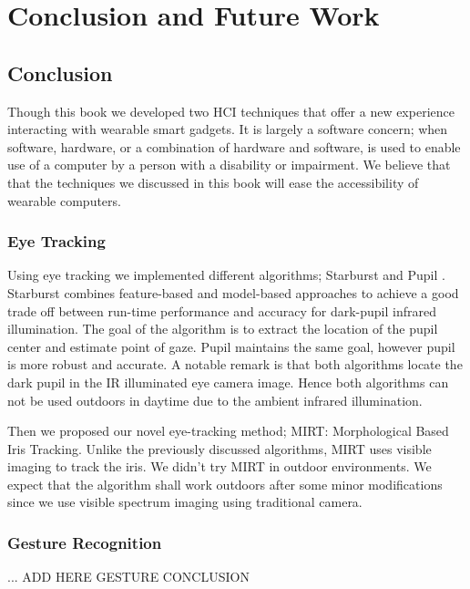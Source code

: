 \chapter{Conclusion and Future Work} 

\section{Conclusion} 
Though this book we developed two HCI techniques that offer a new experience interacting with wearable smart gadgets.  It is largely a software concern; when software, hardware, or a combination of hardware and software, is used to enable use of a computer by a person with a disability or impairment. We believe that that the techniques we discussed in this book will ease the accessibility of wearable computers.

\subsection{Eye Tracking} 
Using eye tracking we implemented different algorithms; Starburst \cite{starburst} and Pupil \cite{pupil}. Starburst combines feature-based and model-based approaches to achieve a good trade off between run-time performance and accuracy for dark-pupil infrared illumination. The goal of the algorithm is to extract the location of the pupil center and estimate point of gaze. Pupil maintains the same goal, however pupil is more robust and accurate. A notable remark is that both algorithms locate the dark pupil in the IR illuminated eye camera image. Hence both algorithms can not be used outdoors in daytime due to the ambient infrared illumination. \bigskip

Then we proposed our novel eye-tracking method; MIRT: Morphological Based Iris Tracking. Unlike the previously discussed algorithms, MIRT uses visible imaging to track the iris. We didn't try MIRT in outdoor environments. We expect that the algorithm shall work outdoors after some minor modifications since we use visible spectrum imaging using traditional camera.


\subsection{Gesture Recognition} 
... ADD HERE GESTURE CONCLUSION \bigskip


